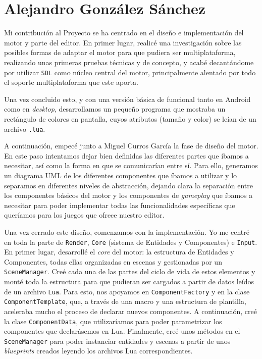 \section*{Alejandro González Sánchez}
Mi contribución al Proyecto se ha centrado en el diseño e implementación del motor y parte del editor. En primer lugar, realicé una investigación sobre las posibles formas de adaptar el motor para que pudiera ser multiplataforma, realizando unas primeras pruebas técnicas y de concepto, y acabé decantándome por utilizar \texttt{SDL} como núcleo central del motor, principalmente alentado por todo el soporte multiplataforma que este aporta.

\medskip

Una vez concluido esto, y con una versión básica de  funcional tanto en Android como en \textit{desktop}, desarrollamos un pequeño programa que mostraba un rectángulo de colores en pantalla, cuyos atributos (tamaño y color) se leían de un archivo \texttt{.lua}. 

A continuación, empecé junto a Miguel Curros García la fase de diseño del motor. En este paso intentamos dejar bien definidas las diferentes partes que íbamos a necesitar, así como la forma en que se comunicarían entre sí. Para ello, generamos un diagrama UML de los diferentes componentes que íbamos a utilizar y lo separamos en diferentes niveles de abstracción, dejando clara la separación entre los componentes básicos del motor y los componentes de \textit{gameplay} que íbamos a necesitar para poder implementar todas las funcionalidades específicas que queríamos para los juegos que ofrece nuestro editor. 

Una vez cerrado este diseño, comenzamos con la implementación. Yo me centré en toda la parte de \texttt{Render}, \texttt{Core} (sistema de Entidades y Componentes) e \texttt{Input}. En primer lugar, desarrollé el \textit{core} del motor: la estructura de Entidades y Componentes, todas ellas organizadas en escenas y gestionadas por un \texttt{SceneManager}. Creé cada una de las partes del ciclo de vida de estos elementos y monté toda la estructura para que pudieran ser cargados a partir de datos leídos de un archivo \texttt{Lua}. Para esto, nos apoyamos en \texttt{ComponentFactory} y en la clase \texttt{ComponentTemplate}, que, a través de una macro y una estructura de plantilla, aceleraba mucho el proceso de declarar nuevos componentes. A continuación, creé la clase \texttt{ComponentData}, que utilizaríamos para poder parametrizar los componentes que declarásemos en Lua. Finalmente, creé unos métodos en el \texttt{SceneManager} para poder instanciar entidades y escenas a partir de unos \textit{blueprints} creados leyendo los archivos Lua correspondientes. 

